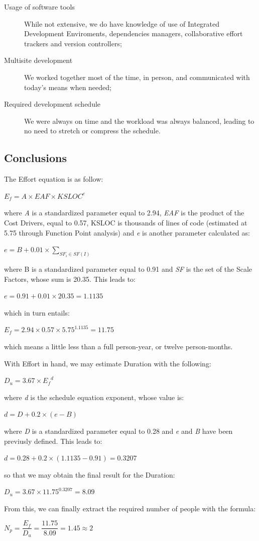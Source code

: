 \begin{description}
\item[Usage of software tools] While not extensive, we do have knowledge of use of Integrated Development Enviroments, dependencies managers, collaborative effort trackers and version controllers;
\item[Multisite development] We worked together most of the time, in person, and communicated with today's means when needed;
\item[Required development schedule] We were always on time and the workload was always balanced, leading to no need to stretch or compress the schedule.
\end{description}

\subsection{Conclusions}
The Effort equation is as follow:
\begin{center}
$ E_f = A \times EAF \times KSLOC^e $
\end{center}
where \emph{A} is a standardized parameter equal to 2.94, \emph{EAF} is the product of the Cost Drivers, equal to 0.57, KSLOC is thousands of lines of code (estimated at 5.75 through Function Point analysis) and \emph{e} is another parameter calculated as:
\begin{center}
$ e = B + 0.01 \times \sum\nolimits_{SF_i \in SF(I)} $
\end{center}
where B is a standardized parameter equal to 0.91 and \emph{SF} is the set of the Scale Factors, whose sum is 20.35. This leads to:
\begin{center}
$ e = 0.91 + 0.01 \times 20.35 = 1.1135 $
\end{center}
which in turn entails:
\begin{center}
$ E_f = 2.94 \times 0.57 \times 5.75^{1.1135} = 11.75 $
\end{center}
which means a little less than a full person-year, or twelve person-months.

With Effort in hand, we may estimate Duration with the following:
\begin{center}
$ D_u = 3.67 \times {E_f}^d $
\end{center}
where \emph{d} is the schedule equation exponent, whose value is:
\begin{center}
$ d = D + 0.2 \times (e - B) $
\end{center}
where \emph{D} is a standardized parameter equal to 0.28 and \emph{e} and \emph{B} have been previusly defined. This leads to:
\begin{center}
$ d = 0.28 + 0.2 \times (1.1135 - 0.91) = 0.3207 $
\end{center}
so that we may obtain the final result for the Duration:
\begin{center}
$ D_u = 3.67 \times {11.75}^{0.3207} = 8.09 $
\end{center}

From this, we can finally extract the required number of people with the formula:
\begin{center}
$ N_p = \dfrac{E_f}{D_u} = \dfrac{11.75}{8.09} = 1.45 \approx 2 $
\end{center}